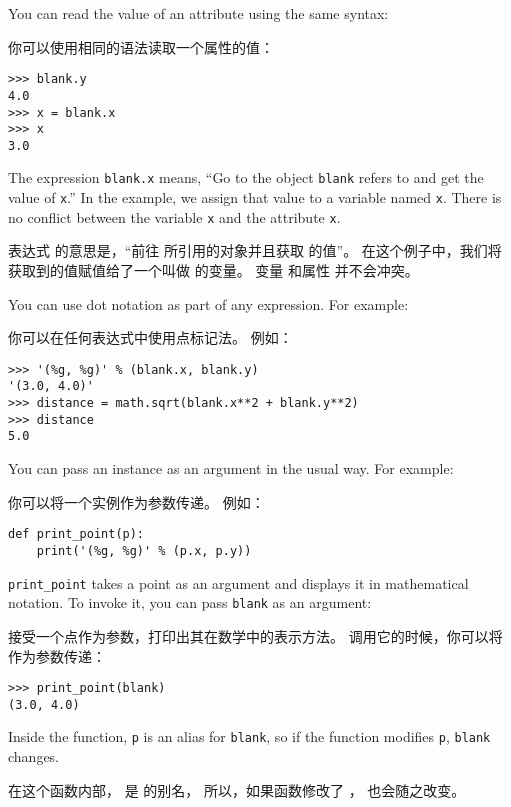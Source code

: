 You can read the value of an attribute using the same syntax:

你可以使用相同的语法读取一个属性的值：

\begin{lstlisting}
>>> blank.y
4.0
>>> x = blank.x
>>> x
3.0
\end{lstlisting}
%
The expression {\tt blank.x} means, ``Go to the object {\tt blank}
refers to and get the value of {\tt x}.''  In the example, we assign that
value to a variable named {\tt x}.  There is no conflict between
the variable {\tt x} and the attribute {\tt x}.

表达式  的意思是，``前往  所引用的对象并且获取  的值''。
在这个例子中，我们将获取到的值赋值给了一个叫做  的变量。
变量  和属性  并不会冲突。

You can use dot notation as part of any expression.  For example:

你可以在任何表达式中使用点标记法。 例如：

\begin{lstlisting}
>>> '(%g, %g)' % (blank.x, blank.y)
'(3.0, 4.0)'
>>> distance = math.sqrt(blank.x**2 + blank.y**2)
>>> distance
5.0
\end{lstlisting}

%
You can pass an instance as an argument in the usual way.
For example:

你可以将一个实例作为参数传递。 例如：


\begin{lstlisting}
def print_point(p):
    print('(%g, %g)' % (p.x, p.y))
\end{lstlisting}

%
\verb"print_point" takes a point as an argument and displays it in
mathematical notation.  To invoke it, you can pass {\tt blank} as
an argument:

 接受一个点作为参数，打印出其在数学中的表示方法。
调用它的时候，你可以将  作为参数传递：

\begin{lstlisting}
>>> print_point(blank)
(3.0, 4.0)
\end{lstlisting}

%
Inside the function, {\tt p} is an alias for {\tt blank}, so if
the function modifies {\tt p}, {\tt blank} changes.

在这个函数内部，  是  的别名，
所以，如果函数修改了  ，  也会随之改变。

